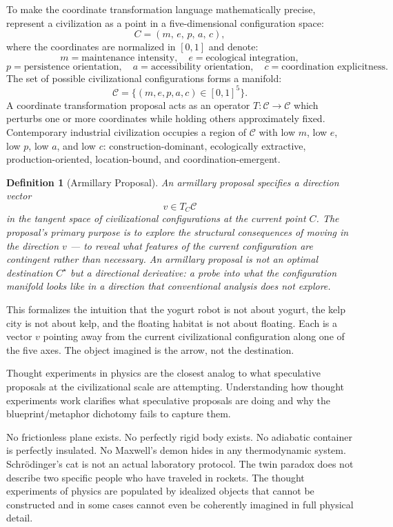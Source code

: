 \documentclass[12pt, a4paper]{article}
\theoremstyle{named}
\newtheorem{definition}{Definition}
\begin{document}
To make the coordinate transformation language mathematically precise,
represent a civilization as a point in a five-dimensional configuration
space:
\[
  C = (m,\, e,\, p,\, a,\, c),
\]
where the coordinates are normalized in $[0,1]$ and denote:
\[
  m = \text{maintenance intensity}, \quad
  e = \text{ecological integration},
\]
\[
  p = \text{persistence orientation}, \quad
  a = \text{accessibility orientation}, \quad
  c = \text{coordination explicitness}.
\]
The set of possible civilizational configurations forms a manifold:
\[
  \mathcal{C} = \bigl\{(m,e,p,a,c) \in [0,1]^5\bigr\}.
\]
A coordinate transformation proposal acts as an operator
$T: \mathcal{C} \to \mathcal{C}$ which perturbs one or more
coordinates while holding others approximately fixed. Contemporary
industrial civilization occupies a region of $\mathcal{C}$ with low
$m$, low $e$, low $p$, low $a$, and low $c$: construction-dominant,
ecologically extractive, production-oriented, location-bound, and
coordination-emergent.

\begin{definition}[Armillary Proposal]
An armillary proposal specifies a direction vector
\[
  v \in T_C\mathcal{C}
\]
in the tangent space of civilizational configurations at the current
point $C$. The proposal's primary purpose is to explore the structural
consequences of moving in the direction $v$ — to reveal what features
of the current configuration are contingent rather than necessary.
An armillary proposal is not an optimal destination $C^\star$ but a
directional derivative: a probe into what the configuration manifold
looks like in a direction that conventional analysis does not explore.
\end{definition}

This formalizes the intuition that the yogurt robot is not about
yogurt, the kelp city is not about kelp, and the floating habitat is
not about floating. Each is a vector $v$ pointing away from the current
civilizational configuration along one of the five axes. The object
imagined is the arrow, not the destination.



Thought experiments in physics are the closest analog to what
speculative proposals at the civilizational scale are attempting.
Understanding how thought experiments work clarifies what speculative
proposals are doing and why the blueprint/metaphor dichotomy fails to
capture them.

No frictionless plane exists. No perfectly rigid body exists. No
adiabatic container is perfectly insulated. No Maxwell's demon hides
in any thermodynamic system. Schrödinger's cat is not an actual
laboratory protocol. The twin paradox does not describe two specific
people who have traveled in rockets. The thought experiments of physics
are populated by idealized objects that cannot be constructed and in
some cases cannot even be coherently imagined in full physical detail.
\end{document}
